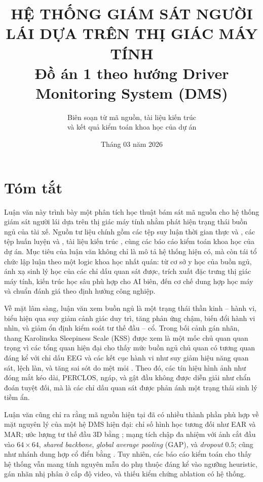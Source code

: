 \documentclass[12pt,a4paper]{article}
\title{\textbf{HỆ THỐNG GIÁM SÁT NGƯỜI LÁI DỰA TRÊN THỊ GIÁC MÁY TÍNH}\\[0.4em]
\large Đồ án 1 theo hướng Driver Monitoring System (DMS)}
\author{Biên soạn từ mã nguồn, tài liệu kiến trúc\\và kết quả kiểm toán khoa học của dự án}
\date{Tháng 03 năm 2026}
\begin{document}
\maketitle
\tableofcontents
\newpage

\section*{Tóm tắt}
Luận văn này trình bày một phân tích học thuật bám sát mã nguồn cho hệ thống giám sát người lái dựa trên thị giác máy tính nhằm phát hiện trạng thái buồn ngủ của tài xế. Nguồn tư liệu chính gồm các tệp suy luận thời gian thực  và , các tệp huấn luyện  và , tài liệu kiến trúc , cùng các báo cáo kiểm toán khoa học của dự án. Mục tiêu của luận văn không chỉ là mô tả hệ thống hiện có, mà còn tái tổ chức lập luận theo một logic khoa học nhất quán: từ cơ sở y học của buồn ngủ, ánh xạ sinh lý học của các chỉ dấu quan sát được, trích xuất đặc trưng thị giác máy tính, kiến trúc học sâu phù hợp cho AI biên, đến cơ chế dung hợp học máy và chuẩn đánh giá theo định hướng công nghiệp.

Về mặt lâm sàng, luận văn xem buồn ngủ là một trạng thái thần kinh -- hành vi, biểu hiện qua suy giảm cảnh giác duy trì, tăng phản ứng chậm, biến đổi hành vi nhìn, và giảm ổn định kiểm soát tư thế đầu -- cổ. Trong bối cảnh gán nhãn, thang Karolinska Sleepiness Scale (KSS) được xem là một mốc chủ quan quan trọng vì các tổng quan hiện đại cho thấy mức buồn ngủ chủ quan có tương quan đáng kể với chỉ dấu EEG và các kết cục hành vi như suy giảm hiệu năng quan sát, lệch làn, và tăng sai sót do mệt mỏi \cite{awareness2021,hussein2023}. Theo đó, các tín hiệu hình ảnh như đóng mắt kéo dài, PERCLOS, ngáp, và gật đầu không được diễn giải như chẩn đoán tuyệt đối, mà là các chỉ dấu quan sát được phản ánh một trạng thái sinh lý tiềm ẩn.

Luận văn cũng chỉ ra rằng mã nguồn hiện tại đã có nhiều thành phần phù hợp về mặt nguyên lý của một hệ DMS hiện đại: chỉ số hình học tương đối như EAR và MAR; ước lượng tư thế đầu 3D bằng ; mạng tích chập đa nhiệm với ảnh cắt đầu vào \(64\times64\), \textit{shared backbone}, \textit{global average pooling} (GAP), và \textit{dropout} \(0.5\); cũng như nhánh dung hợp cổ điển bằng . Tuy nhiên, các báo cáo kiểm toán cho thấy hệ thống vẫn mang tính nguyên mẫu do phụ thuộc đáng kể vào ngưỡng heuristic, gán nhãn nhị phân ở cấp độ video, và thiếu kiểm chứng ablation có hệ thống.
\end{document}
